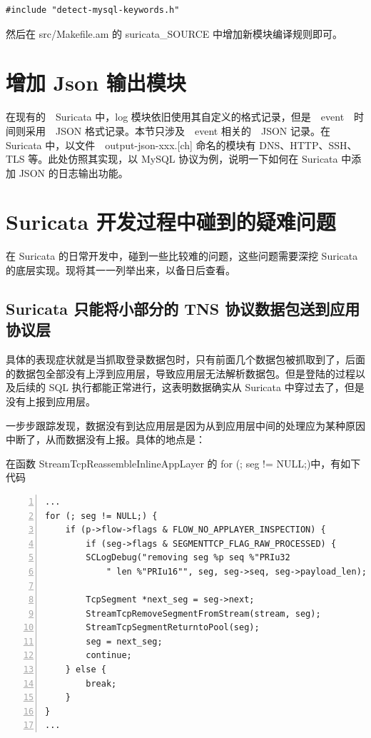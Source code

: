\begin{lstlisting}
#include "detect-mysql-keywords.h"
\end{lstlisting}

然后在 {\ff src/Makefile.am} 的 {\cf suricata\_SOURCE} 中增加新模块编译规则即可。

\section{增加 Json 输出模块}
在现有的　Suricata 中，log 模块依旧使用其自定义的格式记录，但是　event　时间则采用　JSON 格式记录。本节只涉及　event 相关的　JSON 记录。在 Suricata 中，以文件　{\ff output-json-xxx.[ch]} 命名的模块有 DNS、HTTP、SSH、TLS 等。此处仿照其实现，以 MySQL 协议为例，说明一下如何在 Suricata 中添加 JSON 的日志输出功能。

\section{Suricata 开发过程中碰到的疑难问题}\label{sec:dev-problems}
在 Suricata 的日常开发中，碰到一些比较难的问题，这些问题需要深挖 Suricata 的底层实现。现将其一一列举出来，以备日后查看。

\subsection{Suricata 只能将小部分的 TNS 协议数据包送到应用协议层}
具体的表现症状就是当抓取登录数据包时，只有前面几个数据包被抓取到了，后面的数据包全部没有上浮到应用层，导致应用层无法解析数据包。但是登陆的过程以及后续的 SQL 执行都能正常进行，这表明数据确实从 Suricata 中穿过去了，但是没有上报到应用层。

一步步跟踪发现，数据没有到达应用层是因为从到应用层中间的处理应为某种原因中断了，从而数据没有上报。具体的地点是：

在函数 {\cf StreamTcpReassembleInlineAppLayer} 的 {\cf for (; seg != NULL;)}中，有如下代码

\begin{lstlisting}[stepnumber=1,numbersep=8pt,numberstyle=\tiny\color{blue},numbers=left]
...
for (; seg != NULL;) {
    if (p->flow->flags & FLOW_NO_APPLAYER_INSPECTION) {
        if (seg->flags & SEGMENTTCP_FLAG_RAW_PROCESSED) {
        SCLogDebug("removing seg %p seq %"PRIu32
            " len %"PRIu16"", seg, seg->seq, seg->payload_len);

        TcpSegment *next_seg = seg->next;
        StreamTcpRemoveSegmentFromStream(stream, seg);
        StreamTcpSegmentReturntoPool(seg);
        seg = next_seg;
        continue;
    } else {
        break;
    }
}
...
\end{lstlisting}


